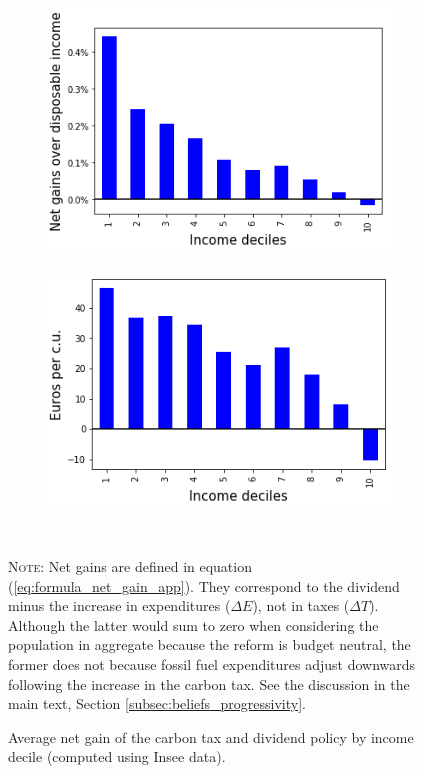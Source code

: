 \documentclass[12pt]{article} %
\begin{document}
\begin{appendices}
\begin{figure}[H]
\begin{subfigure}{.5\textwidth}
\centering
\includegraphics[scale=0.9]{Images/effort_rate_uc.png}
\end{subfigure}\hfill
\begin{subfigure}{.5\textwidth}
\centering
\includegraphics[scale=0.9]{Images/average_cost_decile.png}
\end{subfigure} \\[1ex]
{\footnotesize  \parbox[t]{15.5cm } {\linespread{1.2}\selectfont \textsc{Note:} Net gains are defined in equation (\ref{eq:formula_net_gain_app}). They correspond to the dividend minus the increase in expenditures ($\Delta E$), not in taxes ($\Delta T$). Although the latter would sum to zero when considering the population in aggregate because the reform is budget neutral, the former does not because fossil fuel expenditures adjust downwards following the increase in the carbon tax. See the discussion in the main text, Section \vref{subsec:beliefs_progressivity}.}
\caption{Average net gain of the carbon tax and dividend policy by income decile (computed using Insee data).\label{figure:effort_rate_uc}}
}
\end{figure}


\end{appendices}
\end{document}
